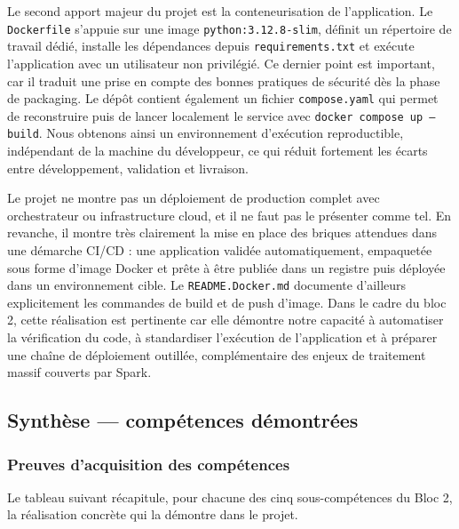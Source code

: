 \documentclass{article}
\begin{document}
Le second apport majeur du projet est la conteneurisation de l'application. Le
\texttt{Dockerfile} s'appuie sur une image \texttt{python:3.12.8-slim}, définit un
répertoire de travail dédié, installe les dépendances depuis \texttt{requirements.txt}
et exécute l'application avec un utilisateur non privilégié. Ce dernier point est
important, car il traduit une prise en compte des bonnes pratiques de sécurité dès la
phase de packaging. Le dépôt contient également un fichier \texttt{compose.yaml} qui
permet de reconstruire puis de lancer localement le service avec
\texttt{docker compose up --build}. Nous obtenons ainsi un environnement d'exécution
reproductible, indépendant de la machine du développeur, ce qui réduit fortement les
écarts entre développement, validation et livraison.

Le projet ne montre pas un déploiement de production complet avec orchestrateur ou
infrastructure cloud, et il ne faut pas le présenter comme tel. En revanche, il montre
très clairement la mise en place des briques attendues dans une démarche CI/CD : une
application validée automatiquement, empaquetée sous forme d'image Docker et prête à
être publiée dans un registre puis déployée dans un environnement cible. Le
\texttt{README.Docker.md} documente d'ailleurs explicitement les commandes de build et
de push d'image. Dans le cadre du bloc 2, cette réalisation est pertinente car elle
démontre notre capacité à automatiser la vérification du code, à standardiser
l'exécution de l'application et à préparer une chaîne de déploiement outillée,
complémentaire des enjeux de traitement massif couverts par Spark.

\newpage
\subsection{Synthèse — compétences démontrées}

\subsubsection{Preuves d'acquisition des compétences}

Le tableau suivant récapitule, pour chacune des cinq sous-compétences du Bloc 2, la
réalisation concrète qui la démontre dans le projet.
\end{document}

